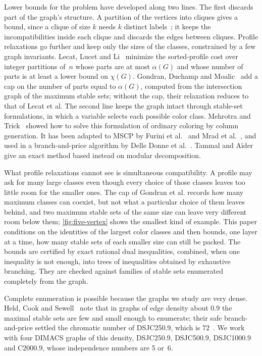 \documentclass[11pt]{article}
\theoremstyle{definition}
\newcommand{\DSJCTwoFifty}{\textnormal{\textsc{DSJC250.9}}}
\newcommand{\DSJCFiveHundred}{\textnormal{\textsc{DSJC500.9}}}
\newcommand{\DSJCThousand}{\textnormal{\textsc{DSJC1000.9}}}
\newcommand{\CTwoThousand}{\textnormal{\textsc{C2000.9}}}
\begin{document}
Lower bounds for the problem have developed along two lines. The first
discards part of the graph's structure. A partition of the vertices into
cliques gives a bound, since a clique of size $k$ needs $k$ distinct
labels~\cite{moukrim2010,wuhao2013}; it keeps the incompatibilities inside
each clique and discards the edges between cliques. Profile relaxations go
further and keep only the sizes of the classes, constrained by a few graph
invariants. Lecat, Lucet and
Li~\cite{lecat2017} minimize the sorted-profile cost over integer partitions
of~$n$ whose parts are at most $\alpha(G)$ and whose number of parts is at
least a lower bound on $\chi(G)$. Gondran, Duchamp and Moalic~\cite{gondran2019}
add a cap on the number of parts equal to $\alpha(G)$, computed from the
intersection graph of the maximum stable sets; without the cap, their
relaxation reduces to that of Lecat et al. The second line keeps the graph
intact through stable-set formulations, in which a variable selects each
possible color class. Mehrotra and Trick~\cite{mehrotra1996} showed how to
solve this formulation of ordinary coloring by column generation. It has been
adapted to MSCP by Furini et al.~\cite{furini2018} and Mrad et
al.~\cite{mrad2020}, and used in a branch-and-price algorithm by Delle Donne
et al.~\cite{delledonne2021}. Tammal and A\"ider~\cite{tammal2025} give an
exact method based instead on modular decomposition.

What profile relaxations cannot see is simultaneous compatibility. A profile
may ask for many large classes even though every choice of those classes
leaves too little room for the smaller ones. The cap of Gondran et al.
records how many maximum classes can coexist, but not what a particular
choice of them leaves behind, and two maximum stable sets of the same size
can leave very different room below them; \cref{fig:five-vertex} shows the
smallest kind of example. This paper conditions on the identities of the
largest color classes and then bounds, one layer at a time, how many stable
sets of each smaller size can still be packed. The bounds are certified by
exact rational dual inequalities, combined, when one inequality is not
enough, into trees of inequalities obtained by exhaustive branching. They are
checked against families of stable sets enumerated completely from the graph.

Complete enumeration is possible because the graphs we study are very dense.
Held, Cook and Sewell~\cite{held2012} note that in graphs of edge density
about $0.9$ the maximal stable sets are few and small enough to enumerate;
their safe branch-and-price settled the chromatic number of \DSJCTwoFifty{},
which is $72$~\cite[Table~3]{held2012}. We work with four DIMACS graphs of
this density, \DSJCTwoFifty{}, \DSJCFiveHundred{}, \DSJCThousand{} and
\CTwoThousand{}, whose independence numbers are 5 or~6.
\end{document}
